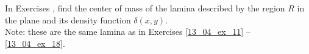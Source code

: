 {\noindent In Exercises}
{, find the center of mass of the lamina described by the region $R$ in the plane and its density function $\delta(x,y)$.\\
Note: these are the same lamina as in Exercises \ref{13_04_ex_11} -- \ref{13_04_ex_18}.
}
